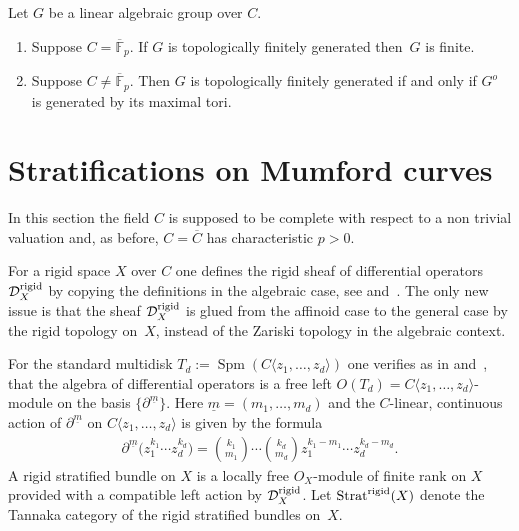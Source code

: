 \documentclass[pdftex]{sigma}
\numberwithin{equation}{section}
\begin{document}
 \begin{Observation}\label{3.8} Let $G$ be a linear algebraic group over $C$.
 \begin{enumerate}\itemsep=0pt
\item[(a)] Suppose $C=\overline{\mathbb{F}}_p$. If $G$ is topologically finitely generated then~$G$ is finite.
\item[(b)] Suppose $C\neq \overline{\mathbb{F}}_p$. Then $G$ is topologically finitely generated if and only if $G^o$ is generated by its maximal tori.
\end{enumerate}
\end{Observation}

 \section{Stratifications on Mumford curves}\label{section4}
 In this section the field $C$ is supposed to be complete with respect to a non trivial valuation and, as before, $C=\overline{C}$ has characteristic $p>0$.

 For a rigid space $X$ over $C$ one defines the rigid sheaf of differential operators $\mathcal{D}_X^{\rm rigid}$ by copying the definitions in the algebraic case, see \cite[Section~16.8.1]{EGA4} and~\cite{Gie}. The only new issue is that the sheaf $\mathcal{D}_X^{\rm rigid}$ is glued from the affinoid case to the general case by the rigid topology on~$X$, instead of the Zariski topology in the algebraic context.

 For the standard multidisk $T_d:=\operatorname{Spm}(C\langle z_1,\dots ,z_d\rangle)$ one verifies as in \cite[Th\'eor\`eme~16.11.2]{EGA4} and~\cite{Gie}, that the algebra of differential operators is a free left $O(T_d)=C\langle z_1,\dots ,z_d\rangle $-module on the basis $\big\{\partial^{\underline{m}}\big\}$. Here $\underline{m}=(m_1,\dots ,m_d)$ and the $C$-linear, continuous action of $\partial^{\underline{m}}$ on $C\langle z_1,\dots , z_d\rangle$ is given by the formula
 \begin{gather*} \partial^{\underline{m}}\big(z_1^{k_1}\cdots z_d^{k_d}\big)= {k_1\choose m_1 }\cdots {k_d\choose m_d} z_1^{k_1-m_1}\cdots z_d^{k_d-m_d}.\end{gather*}
 A rigid stratified bundle on $X$ is a locally free $O_X$-module of finite rank on $X$ provided with a compatible left action by $\mathcal{D}^{\rm rigid}_X$. Let $\operatorname{Strat}^{\rm rigid}(X)$ denote the Tannaka category of the rigid stratified bundles on~$X$.
\end{document}
